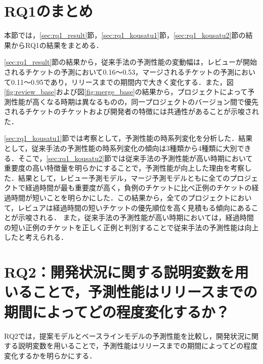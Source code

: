 \documentclass[submit]{ipsj}
\newcommand{\rqtwo}{開発状況に関する説明変数を用いることで，予測性能はリリースまでの期間によってどの程度変化するか？}
\begin{document}
\section{RQ1のまとめ}\label{sec:rq1_matome}
本節では，\ref{sec:rq1_result}節，\ref{sec:rq1_kousatu1}節，\ref{sec:rq1_kousatu2}節の結果からRQ1の結果をまとめる．

\ref{sec:rq1_result}節の結果から，従来手法の予測性能の変動幅は，レビューが開始されるチケットの予測において0.16〜0.53，マージされるチケットの予測において0.11〜0.95であり，リリースまでの期間内で大きく変化する．また，図\ref{fig:review_base}および図\ref{fig:merge_base}の結果から，プロジェクトによって予測性能が高くなる時期は異なるものの，同一プロジェクトのバージョン間で優先されるチケットのチケットおよび開発者の特徴には共通性があることが示唆された．

\ref{sec:rq1_kousatu1}節では考察として，予測性能の時系列変化を分析した．結果として，従来手法の予測性能の時系列変化の傾向は3種類から4種類に大別できる．そこで，\ref{sec:rq1_kousatu2}節では従来手法の予測性能が高い時期において重要度の高い特徴量を明らかにすることで，予測性能が向上した理由を考察した．結果として，レビュー予測モデル，マージ予測モデルともに全てのプロジェクトで経過時間が最も重要度が高く，負例のチケットに比べ正例のチケットの経過時間が短いことを明らかにした．この結果から，全てのプロジェクトにおいて，レビュアは経過時間の短いチケットの優先順位を高く見積もる傾向にあることが示唆される．
また，従来手法の予測性能が高い時期においては，経過時間の短い正例のチケットを正しく正例と判別することで従来手法の予測性能は向上したと考えられる．


\section{RQ2：\rqtwo}\label{sec:rq2}

RQ2では，提案モデルとベースラインモデルの予測性能を比較し，開発状況に関する説明変数を用いることで，予測性能はリリースまでの期間によってどの程度変化するかを明らかにする．
\end{document}
